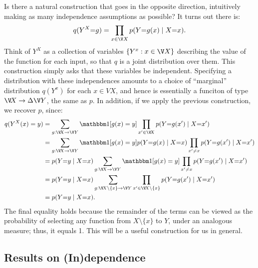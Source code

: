 \begin{subappendices}
Is there a natural construction that goes in the opposite direction, intuitively
making as many independence assumptions as possible? It turns out there is:
\[
    q(Y^X{=} g) = \prod_{x \in \V X} p(Y{=}g(x) \mid X{=}x).
\]
Think of $Y^X$ as a collection of variables $\{Y^x : x \in \V X\}$ describing the
value of the function for each input, so that $q$ is a joint distribution over them.
This construction simply asks that these variables be independent. 
Specifying a distribution with these independences amounts to a choice
    of ``marginal'' distribution $q(Y^x)$ for each $x \in V X$, and hence
    is essentially a funciton of type $\V\! X \to \Delta \V Y$, the same as $p$. 
In addition, if we apply the previous construction, we recover $p$, since:
\begin{align*}
    q(Y^X(x) = y)
        &= \sum_{g: \V\! X \to \V Y} \mathbbm1[g(x)=y]\prod_{x' \in \V\! X} p(Y{=}g(x') \mid X{=}x') \\
        &= \sum_{g: \V\! X \to \V Y} \mathbbm1[g(x)=y] p(Y{=}g(x)\mid X{=}x)\prod_{x' \ne x} p(Y{=}g(x') \mid X{=}x') \\
        &=  p(Y{=}y\mid X{=}x) \sum_{g: \V\! X \to \V Y} \mathbbm1[g(x)=y] \prod_{x' \ne x} p(Y{=}g(x') \mid X{=}x') \\
        &=  p(Y{=}y\mid X{=}x) \sum_{g: \V\! X \setminus \{x\} \to \V Y} \prod_{x' \in \V \! X \setminus \{x\} } p(Y{=}g(x') \mid X{=}x') \\
        &=  p(Y{=}y\mid X{=}x).
\end{align*}
The final equality holds because the remainder of the terms can be viewed as the probability of selecting any function from $X \setminus \{x\}$ to $Y$, under an analogous measure; thus, it equals 1. 
This will be a useful construction for us in general.
%


\subsection{Results on (In)dependence}


\end{subappendices}
